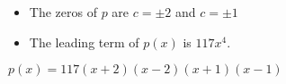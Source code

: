{\begin{itemize}

\item The zeros of $p$ are $c = \pm 2$ and $c = \pm 1$
\item The leading term of $p(x)$ is $117x^4$.

\end{itemize}}
{$p(x) = 117(x+2)(x-2)(x+1)(x-1)$}